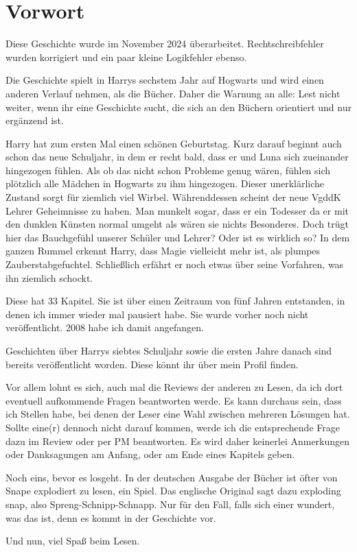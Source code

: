 \chapter{Vorwort}

Diese Geschichte wurde im November 2024 überarbeitet.
Rechtschreibfehler wurden korrigiert und ein paar kleine Logikfehler ebenso.



Die Geschichte spielt in Harrys sechstem Jahr auf Hogwarts und wird einen anderen Verlauf nehmen, als die Bücher. Daher die Warnung an alle: Lest nicht weiter, wenn ihr eine Geschichte sucht, die sich an den Büchern orientiert und nur ergänzend ist.

Harry hat zum ersten Mal einen schönen Geburtstag. Kurz darauf beginnt auch schon das neue Schuljahr, in dem er recht bald, dass er und Luna sich zueinander hingezogen fühlen. Als ob das nicht schon Probleme genug wären, fühlen sich plötzlich alle Mädchen in Hogwarts zu ihm hingezogen. Dieser unerklärliche Zustand sorgt für ziemlich viel Wirbel. Währenddessen scheint der neue VgddK Lehrer Geheimnisse zu haben. Man munkelt sogar, dass er ein Todesser da er mit den dunklen Künsten normal umgeht als wären sie nichts Besonderes. Doch trügt hier das Bauchgefühl unserer Schüler und Lehrer? Oder ist es wirklich so? In dem ganzen Rummel erkennt Harry, dass Magie vielleicht mehr ist, als plumpes Zauberstabgefuchtel. Schließlich erfährt er noch etwas über seine Vorfahren, was ihn ziemlich schockt.



Diese hat 33 Kapitel. Sie ist über einen Zeitraum von fünf Jahren entstanden, in denen ich immer wieder mal pausiert habe. Sie wurde vorher noch nicht veröffentlicht. 2008 habe ich damit angefangen.

Geschichten über Harrys siebtes Schuljahr sowie die ersten Jahre danach sind bereits veröffentlicht worden. 
Diese könnt ihr über mein Profil finden.

Vor allem lohnt es sich, auch mal die Reviews der anderen zu Lesen, da ich dort eventuell aufkommende Fragen beantworten werde. Es kann durchaus sein, dass ich Stellen habe, bei denen der Leser eine Wahl zwischen mehreren Lösungen hat. Sollte eine(r) dennoch nicht darauf kommen, werde ich die entsprechende Frage dazu im Review oder per PM beantworten. Es wird daher keinerlei Anmerkungen oder Danksagungen am Anfang, oder am Ende eines Kapitels geben.

Noch eins, bevor es losgeht. In der deutschen Ausgabe der Bücher ist öfter von Snape explodiert zu lesen, ein Spiel. Das englische Original sagt dazu exploding snap, also Spreng-Schnipp-Schnapp. Nur für den Fall, falls sich einer wundert, was das ist, denn es kommt in der Geschichte vor.

Und nun, viel Spaß beim Lesen.

